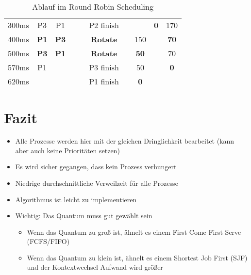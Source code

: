 \documentclass{article}
\begin{document}
\begin{table}[!h]
\begin{tabular}{c|cccc|c|cccc}
        300ms                                   & P3                                              & P1              &                 &                 & P2 finish       &              &              & \textbf{0}  & 170         \\
        400ms                                   & \textbf{P1}                                     & \textbf{P3}     &                 &                 & \textbf{Rotate} &              & 150          &             & \textbf{70} \\
        500ms                                   & \textbf{P3}                                     & \textbf{P1}     &                 &                 & \textbf{Rotate} &              & \textbf{50}  &             & 70          \\
        570ms                                   & P1                                              &                 &                 &                 & P3 finish       &              & 50           &             & \textbf{0}  \\
        620ms                                   &                                                 &                 &                 &                 & P1 finish       &              & \textbf{0}   &             &
    \end{tabular}
    \caption{Ablauf im Round Robin Scheduling}
\end{table}

\section{Fazit}

\begin{itemize}
    \item Alle Prozesse werden hier mit der gleichen Dringlichkeit bearbeitet (kann aber auch keine Prioritäten setzen)
    \item Es wird sicher gegangen, dass kein Prozess verhungert
    \item Niedrige durchschnittliche Verweilzeit für alle Prozesse
    \item Algorithmus ist leicht zu implementieren
    \item Wichtig: Das Quantum muss gut gewählt sein
          \begin{itemize}
              \item Wenn das Quantum zu groß ist, ähnelt es einem First Come First Serve (FCFS/FIFO)
              \item Wenn das Quantum zu klein ist, ähnelt es einem Shortest Job First (SJF) und der Kontextwechsel Aufwand wird größer
          \end{itemize}
\end{itemize}

\nocite{*}
\printbibliography
\end{document}

